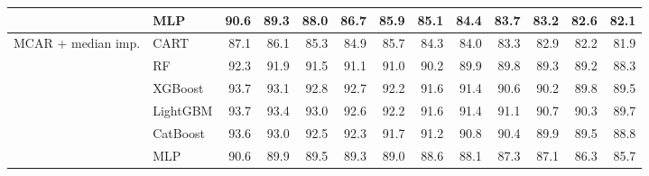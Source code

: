\begin{table}[p]
\begin{tabular}{@{}llrrrrrrrrrrr@{}}
 & MLP & 90.6 & 89.3 & 88.0 & 86.7 & 85.9 & 85.1 & 84.4 & 83.7 & 83.2 & 82.6 & 82.1 \\
\midrule
MCAR + median imp. & CART & 87.1 & 86.1 & 85.3 & 84.9 & 85.7 & 84.3 & 84.0 & 83.3 & 82.9 & 82.2 & 81.9 \\
 & RF & 92.3 & 91.9 & 91.5 & 91.1 & 91.0 & 90.2 & 89.9 & 89.8 & 89.3 & 89.2 & 88.3 \\
 & XGBoost & 93.7 & 93.1 & 92.8 & 92.7 & 92.2 & 91.6 & 91.4 & 90.6 & 90.2 & 89.8 & 89.5 \\
 & LightGBM & 93.7 & 93.4 & 93.0 & 92.6 & 92.2 & 91.6 & 91.4 & 91.1 & 90.7 & 90.3 & 89.7 \\
 & CatBoost & 93.6 & 93.0 & 92.5 & 92.3 & 91.7 & 91.2 & 90.8 & 90.4 & 89.9 & 89.5 & 88.8 \\
 & MLP & 90.6 & 89.9 & 89.5 & 89.3 & 89.0 & 88.6 & 88.1 & 87.3 & 87.1 & 86.3 & 85.7 \\
\bottomrule
\end{tabular}
\end{table}

